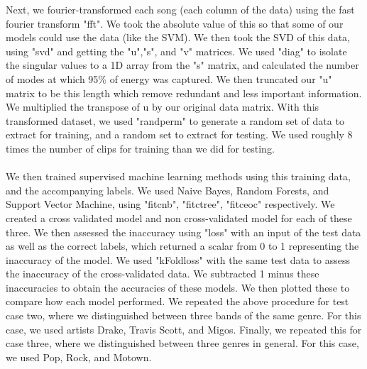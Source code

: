 \documentclass{article}
\begin{document}
Next, we fourier-transformed each song (each column of the data) using the fast fourier transform "fft". We took the absolute value of this so that some of our models could use the data (like the SVM). We then took the SVD of this data, using "svd" and getting the "u","s", and "v" matrices. We used "diag" to isolate the singular values to a 1D array from the "s" matrix, and calculated the number of modes at which 95\% of energy was captured. We then truncated our "u" matrix to be this length which remove redundant and less important information. We multiplied the transpose of u by our original data matrix. With this transformed dataset, we used "randperm" to generate a random set of data to extract for training, and a random set to extract for testing. We used roughly 8 times the number of clips for training than we did for testing. \\ \\
We then trained supervised machine learning methods using this training data, and the accompanying labels. We used Naive Bayes, Random Forests, and Support Vector Machine, using "fitcnb",  "fitctree", "fitceoc" respectively. We created a cross validated model and non cross-validated model for each of these three. We then assessed the inaccuracy using "loss" with an input of the test data as well as the correct labels, which returned a scalar from 0 to 1 representing the inaccuracy of the model. We used "kFoldloss" with the same test data to assess the inaccuracy of the cross-validated data. We subtracted 1 minus these inaccuracies to obtain the accuracies of these models. We then plotted these to compare how each model performed.
	We repeated the above procedure for test case two, where we distinguished between three bands of the same genre. For this case, we used artists Drake, Travis Scott, and Migos. Finally, we repeated this for case three, where we distinguished between three genres in general. For this case, we used Pop, Rock, and Motown.
\end{document}
